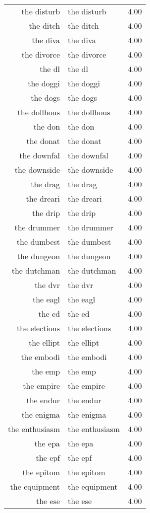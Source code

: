 \begin{table}[ht]
\begin{tabular}{rlr}
  the disturb & the disturb & 4.00 \\ 
  the ditch & the ditch & 4.00 \\ 
  the diva & the diva & 4.00 \\ 
  the divorce & the divorce & 4.00 \\ 
  the dl & the dl & 4.00 \\ 
  the doggi & the doggi & 4.00 \\ 
  the dogs & the dogs & 4.00 \\ 
  the dollhous & the dollhous & 4.00 \\ 
  the don & the don & 4.00 \\ 
  the donat & the donat & 4.00 \\ 
  the downfal & the downfal & 4.00 \\ 
  the downside & the downside & 4.00 \\ 
  the drag & the drag & 4.00 \\ 
  the dreari & the dreari & 4.00 \\ 
  the drip & the drip & 4.00 \\ 
  the drummer & the drummer & 4.00 \\ 
  the dumbest & the dumbest & 4.00 \\ 
  the dungeon & the dungeon & 4.00 \\ 
  the dutchman & the dutchman & 4.00 \\ 
  the dvr & the dvr & 4.00 \\ 
  the eagl & the eagl & 4.00 \\ 
  the ed & the ed & 4.00 \\ 
  the elections & the elections & 4.00 \\ 
  the ellipt & the ellipt & 4.00 \\ 
  the embodi & the embodi & 4.00 \\ 
  the emp & the emp & 4.00 \\ 
  the empire & the empire & 4.00 \\ 
  the endur & the endur & 4.00 \\ 
  the enigma & the enigma & 4.00 \\ 
  the enthusiasm & the enthusiasm & 4.00 \\ 
  the epa & the epa & 4.00 \\ 
  the epf & the epf & 4.00 \\ 
  the epitom & the epitom & 4.00 \\ 
  the equipment & the equipment & 4.00 \\ 
  the ese & the ese & 4.00 \\ 

\end{tabular}
\end{table}
